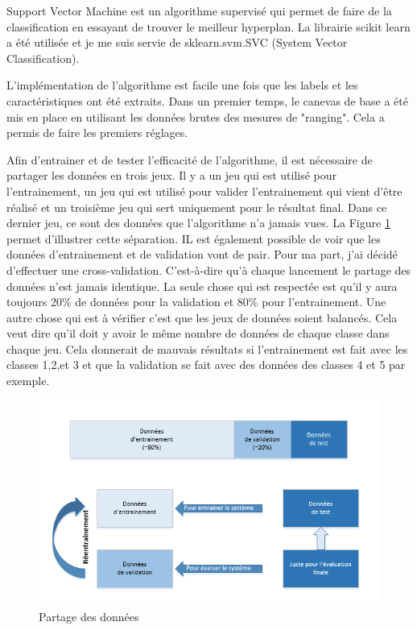 Support Vector Machine est un algorithme supervisé qui permet de faire de la classification en essayant de trouver le meilleur hyperplan. La librairie scikit learn a été utilisée et je me suis servie de sklearn.svm.SVC (System Vector Classification).

L’implémentation de l’algorithme est facile une fois que les labels et les caractéristiques ont été extraits. Dans un premier temps, le canevas de base a été mis en place en utilisant les données brutes des mesures de "ranging". Cela a permis de faire les premiers réglages. 

Afin d'entrainer et de tester l'efficacité de l'algorithme, il est nécessaire de partager les données en trois jeux. Il y a un jeu qui est utilisé pour l'entrainement, un jeu qui est utilisé pour valider l'entrainement qui vient d'être réalisé et un troisième jeu qui sert uniquement pour le résultat final. Dans ce dernier jeu, ce sont des données que l'algorithme n'a jamais vues. La Figure \ref{fig:datasep} permet d'illustrer cette séparation. IL est également possible de voir que les données d'entrainement et de validation vont de pair. Pour ma part, j'ai décidé d'effectuer une cross-validation. C'est-à-dire qu'à chaque lancement le partage des données n'est jamais identique. La seule chose qui est respectée est qu'il y aura toujours 20\% de données pour la validation et 80\% pour l'entrainement. Une autre chose qui est à vérifier c'est que les jeux de données soient balancés. Cela veut dire qu'il doit y avoir le même nombre de données de chaque classe dans chaque jeu. Cela donnerait de mauvais résultats si l'entrainement est fait avec les classes 1,2,et 3 et que la validation se fait avec des données des classes 4 et 5 par exemple. 

\begin{figure}[htp]
 \begin{center}
  \includegraphics[scale=0.7]{figures/data_separation.png}
  \caption{Partage des données}
  \label{fig:datasep} %
 \end{center}
\end{figure}

